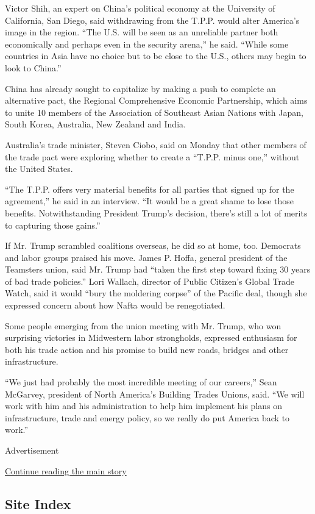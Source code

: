 Victor Shih, an expert on China's political economy at the University of
California, San Diego, said withdrawing from the T.P.P. would alter
America's image in the region. ``The U.S. will be seen as an unreliable
partner both economically and perhaps even in the security arena,'' he
said. ``While some countries in Asia have no choice but to be close to
the U.S., others may begin to look to China.''

China has already sought to capitalize by making a push to complete an
alternative pact, the Regional Comprehensive Economic Partnership, which
aims to unite 10 members of the Association of Southeast Asian Nations
with Japan, South Korea, Australia, New Zealand and India.

Australia's trade minister, Steven Ciobo, said on Monday that other
members of the trade pact were exploring whether to create a ``T.P.P.
minus one,'' without the United States.

``The T.P.P. offers very material benefits for all parties that signed
up for the agreement,'' he said in an interview. ``It would be a great
shame to lose those benefits. Notwithstanding President Trump's
decision, there's still a lot of merits to capturing those gains.''

If Mr. Trump scrambled coalitions overseas, he did so at home, too.
Democrats and labor groups praised his move. James P. Hoffa, general
president of the Teamsters union, said Mr. Trump had ``taken the first
step toward fixing 30 years of bad trade policies.'' Lori Wallach,
director of Public Citizen's Global Trade Watch, said it would ``bury
the moldering corpse'' of the Pacific deal, though she expressed concern
about how Nafta would be renegotiated.

Some people emerging from the union meeting with Mr. Trump, who won
surprising victories in Midwestern labor strongholds, expressed
enthusiasm for both his trade action and his promise to build new roads,
bridges and other infrastructure.

``We just had probably the most incredible meeting of our careers,''
Sean McGarvey, president of North America's Building Trades Unions,
said. ``We will work with him and his administration to help him
implement his plans on infrastructure, trade and energy policy, so we
really do put America back to work.''

Advertisement

\protect\hyperlink{after-bottom}{Continue reading the main story}

\hypertarget{site-index}{%
\subsection{Site Index}\label{site-index}}

